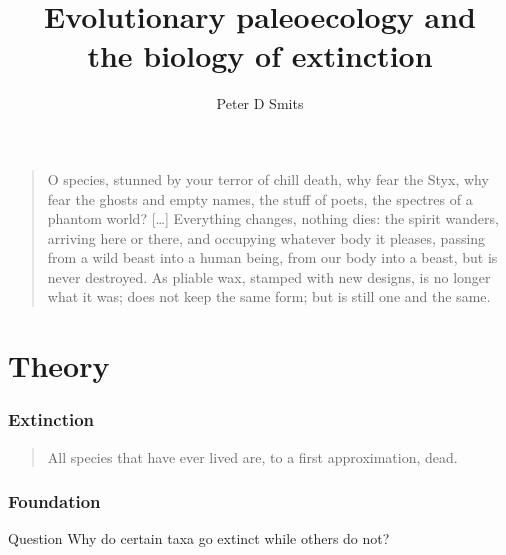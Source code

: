\documentclass{beamer}
\title{Evolutionary paleoecology and \\the biology of extinction}
\author{Peter D Smits}
\institute{Committee on Evolutionary Biology, University of Chicago}
\begin{document}
\begin{frame}
  \begin{quotation}
    O species, stunned by your terror of chill death, why fear the Styx, why
    fear the ghosts and empty names, the stuff of poets, the spectres of a
    phantom world? [\dots] Everything changes, nothing dies: the spirit
    wanders, arriving here or there, and occupying whatever body it pleases,
    passing from a wild beast into a human being, from our body into a
    beast, but is never destroyed. As pliable wax, stamped with new designs,
    is no longer what it was; does not keep the same form; but is still one
    and the same.
    
  \end{quotation}
\end{frame}

\begin{frame}
  \maketitle
\end{frame}

\begin{frame}
  \tableofcontents
\end{frame}


\section{Theory}

\begin{frame}
  \frametitle{Extinction}

  \begin{quotation}
    All species that have ever lived are, to a first approximation, dead.

    \tiny{}
  \end{quotation}
\end{frame}

\begin{frame}
  \frametitle{Foundation}

  \begin{alertblock}{Question}
    Why do certain taxa go extinct while others do not?
  \end{alertblock}
\end{frame}
\end{document}
